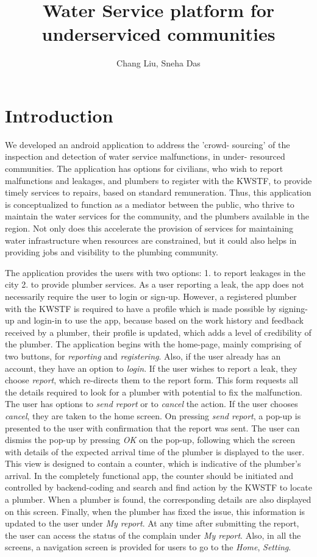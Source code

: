 \documentclass{article}
\title{Water Service platform for underserviced communities}
\author{Chang Liu, Sneha Das}
\begin{document}
\maketitle

\section{Introduction}
We developed an android application to address the ’crowd-
sourcing’ of the inspection and detection of water service malfunctions, in under-
resourced communities. The application has options for civilians, who wish to
report malfunctions and leakages, and plumbers to register with the KWSTF,
to provide timely services to repairs, based on standard remuneration. Thus,
this application is conceptualized to function as a mediator between the public,
who thrive to maintain the water services for the community, and the plumbers
available in the region. Not only does this accelerate the provision of services
for maintaining water infrastructure when resources are constrained, but it could also
helps in providing jobs and visibility to the plumbing community.

The application provides the users with two options: 1. to report leakages in the city 2. to provide plumber services. As a user reporting a leak, the app does not necessarily require the user to login or sign-up. However, a registered plumber with the KWSTF is required to have a profile which is made possible by signing-up and login-in to use the app, because based on the work history and feedback received by a plumber, their profile 
is updated, which adds a level of credibility of the plumber. The application begins with the home-page, mainly
comprising of two buttons, for {\it reporting} and {\it registering}. Also, if the user already has an account, they have 
an option to {\it login}. If the user wishes to report a leak, they choose {\it report}, which re-directs
them to the report form. This form requests all the details required to look for a plumber with potential 
to fix the malfunction. The user has options to {\it send report} or to {\it cancel} the action. If the user chooses {\it cancel}, they are taken to the home screen. On pressing
{\it send report}, a pop-up is presented to the user with confirmation that the report was sent. The user 
can dismiss the pop-up by pressing {\it OK} on the pop-up, following which the screen with details of the expected arrival time of the plumber is displayed to the user. This view is designed to contain a counter, which is indicative of the plumber's arrival. In the completely functional app, the counter should be initiated and controlled by backend-coding and search and find action by the KWSTF to locate a plumber. When a plumber is found, the corresponding details are also displayed on this screen. Finally, when the plumber
has fixed the issue, this information is updated to the user under {\it My report}. At any time after submitting the report, the user can access the status of the complain under {\it My report}. Also, in all the screens, a navigation screen is provided for users to go to the {\it Home}, {\it Setting}.
\end{document}
